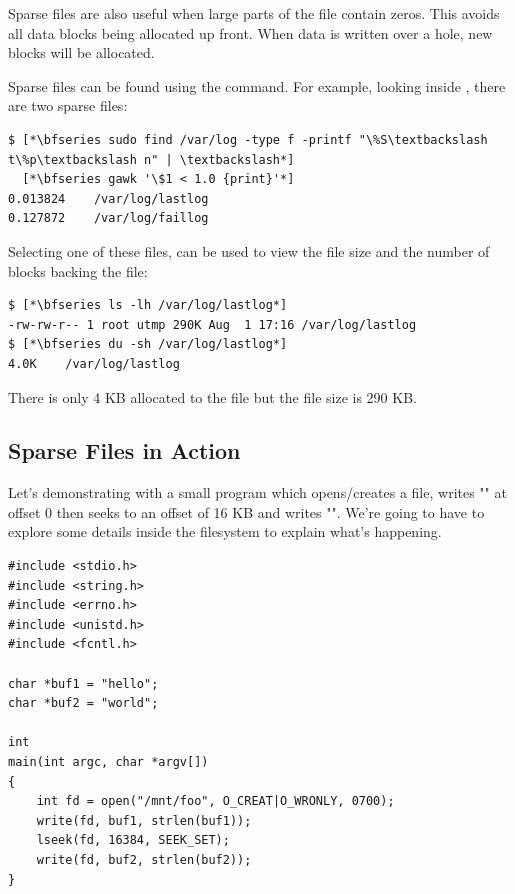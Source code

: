 Sparse files are also useful when large parts of the file contain zeros. This avoids all data blocks being allocated up front. When data is written over a hole, new blocks will be allocated.

Sparse files can be found using the  command. For example, looking inside , there are two sparse files:

\begin{lstlisting}
$ [*\bfseries sudo find /var/log -type f -printf "\%S\textbackslash t\%p\textbackslash n" | \textbackslash*]
  [*\bfseries gawk '\$1 < 1.0 {print}'*]
0.013824	/var/log/lastlog
0.127872	/var/log/faillog
\end{lstlisting}

\noindent
Selecting one of these files,  can be used to view the file size and the number of blocks backing the file:

\begin{lstlisting}
$ [*\bfseries ls -lh /var/log/lastlog*]
-rw-rw-r-- 1 root utmp 290K Aug  1 17:16 /var/log/lastlog
$ [*\bfseries du -sh /var/log/lastlog*]
4.0K	/var/log/lastlog
\end{lstlisting}

\noindent
There is only 4 KB allocated to the file but the file size is 290 KB.


\subsection{Sparse Files in Action}

Let's demonstrating with a small program which opens/creates a file, writes "" at offset 0 then seeks to an offset of 16 KB and writes "". We're going to have to explore some details inside the filesystem to explain what's happening.

\begin{lstlisting}
#include <stdio.h>
#include <string.h>
#include <errno.h>
#include <unistd.h>
#include <fcntl.h>

char *buf1 = "hello";
char *buf2 = "world";

int
main(int argc, char *argv[])
{
    int fd = open("/mnt/foo", O_CREAT|O_WRONLY, 0700);
    write(fd, buf1, strlen(buf1));
    lseek(fd, 16384, SEEK_SET);
    write(fd, buf2, strlen(buf2));
}
\end{lstlisting}

